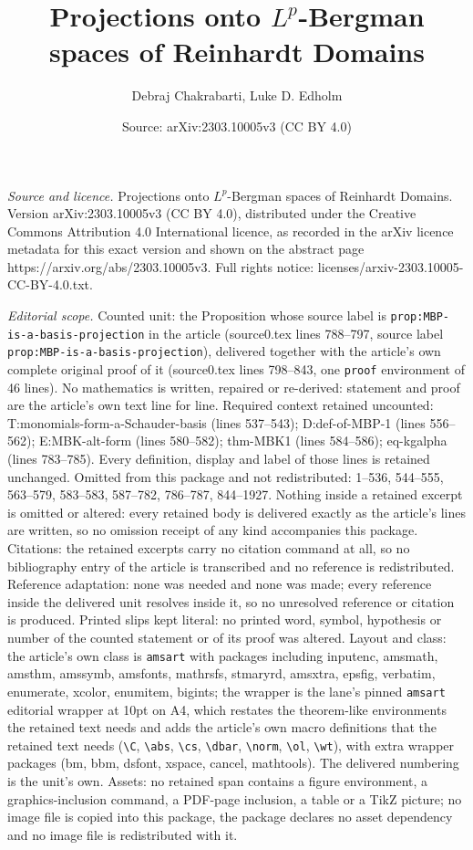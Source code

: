 \documentclass[10pt,a4paper]{amsart}
\title[Projections onto $L^p$-Bergman spaces of Reinhardt Domains]{Projections onto $L^p$-Bergman spaces of Reinhardt Domains}
\author{Debraj Chakrabarti, Luke D. Edholm}
\date{Source: arXiv:2303.10005v3 (CC BY 4.0)}
\begin{document}
\maketitle

\noindent\emph{Source and licence.} Projections onto $L^p$-Bergman spaces of Reinhardt Domains. Version arXiv:2303.10005v3 (CC BY 4.0), distributed under the Creative Commons Attribution 4.0 International licence, as recorded in the arXiv licence metadata for this exact version and shown on the abstract page https://arxiv.org/abs/2303.10005v3. Full rights notice: licenses/arxiv-2303.10005-CC-BY-4.0.txt.\par\smallskip

\noindent\textit{Editorial scope.} Counted unit: the Proposition whose source label is \texttt{prop:MBP-is-a-basis-projection} in the article (source0.tex lines 788--797, source label \texttt{prop:MBP-is-a-basis-projection}), delivered together with the article's own complete original proof of it (source0.tex lines 798--843, one \texttt{proof} environment of 46 lines). No mathematics is written, repaired or re-derived: statement and proof are the article's own text line for line. Required context retained uncounted: T:monomials-form-a-Schauder-basis (lines 537--543); D:def-of-MBP-1 (lines 556--562); E:MBK-alt-form (lines 580--582); thm-MBK1 (lines 584--586); eq-kgalpha (lines 783--785). Every definition, display and label of those lines is retained unchanged. Omitted from this package and not redistributed: 1--536, 544--555, 563--579, 583--583, 587--782, 786--787, 844--1927. Nothing inside a retained excerpt is omitted or altered: every retained body is delivered exactly as the article's lines are written, so no omission receipt of any kind accompanies this package. Citations: the retained excerpts carry no citation command at all, so no bibliography entry of the article is transcribed and no reference is redistributed. Reference adaptation: none was needed and none was made; every reference inside the delivered unit resolves inside it, so no unresolved reference or citation is produced. Printed slips kept literal: no printed word, symbol, hypothesis or number of the counted statement or of its proof was altered. Layout and class: the article's own class is \texttt{amsart} with packages including inputenc, amsmath, amsthm, amssymb, amsfonts, mathrsfs, stmaryrd, amsxtra, epsfig, verbatim, enumerate, xcolor, enumitem, bigints; the wrapper is the lane's pinned \texttt{amsart} editorial wrapper at 10pt on A4, which restates the theorem-like environments the retained text needs and adds the article's own macro definitions that the retained text needs (\texttt{\textbackslash C}, \texttt{\textbackslash abs}, \texttt{\textbackslash cs}, \texttt{\textbackslash dbar}, \texttt{\textbackslash norm}, \texttt{\textbackslash ol}, \texttt{\textbackslash wt}), with extra wrapper packages (bm, bbm, dsfont, xspace, cancel, mathtools). The delivered numbering is the unit's own. Assets: no retained span contains a figure environment, a graphics-inclusion command, a PDF-page inclusion, a table or a TikZ picture; no image file is copied into this package, the package declares no asset dependency and no image file is redistributed with it. 
\end{document}
